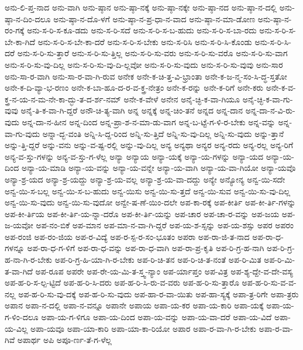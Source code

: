 {ಅನು-ಲಿ-ಪ್ತ-ನಾದ
ಅನು-ವಾಗಿ
ಅನು-ಷ್ಠಾನ
ಅನು-ಷ್ಠಾ-ನಕ್ಕೆ
ಅನು-ಷ್ಠಾ-ನಕ್ಕೇ
ಅನು-ಷ್ಠಾ-ನದ
ಅನು-ಷ್ಠಾ-ನ-ದಲ್ಲಿ
ಅನು-ಷ್ಠಾ-ನ-ದಿಂ-ದಲೂ
ಅನು-ಷ್ಠಾ-ನ-ದೊ-ಳಗೆ
ಅನು-ಷ್ಠಾ-ನ-ಪ್ರ-ಧಾ-ನ-ವಾದ
ಅನು-ಷ್ಠಾ-ನ-ಮಾ-ಡೋಣ
ಅನು-ಷ್ಠಾ-ನ-ರಂ-ಗಕ್ಕೆ
ಅನು-ಸ-ರಿ-ಸ-ಕೂ-ಡದು
ಅನು-ಸ-ರಿ-ಸದೆ
ಅನು-ಸ-ರಿ-ಸ-ಬ-ಹುದು
ಅನು-ಸ-ರಿ-ಸ-ಬಾ-ರದು
ಅನು-ಸ-ರಿ-ಸ-ಬೇ-ಕಾ-ಗಿದೆ
ಅನು-ಸ-ರಿ-ಸ-ಬೇ-ಕಾ-ದರೆ
ಅನು-ಸ-ರಿ-ಸ-ಬೇಕು
ಅನು-ಸ-ರಿಸಿ
ಅನು-ಸ-ರಿ-ಸಿ-ಕೊಂಡು
ಅನು-ಸ-ರಿ-ಸಿ-ದರೆ
ಅನು-ಸ-ರಿ-ಸು-ತ್ತಾರೆ
ಅನು-ಸ-ರಿ-ಸು-ತ್ತಿಲ್ಲ
ಅನು-ಸ-ರಿ-ಸು-ವರು
ಅನು-ಸ-ರಿ-ಸು-ವರೊ
ಅನು-ಸ-ರಿ-ಸು-ವಾಗ
ಅನು-ಸ-ರಿ-ಸು-ವು-ದಿಲ್ಲ
ಅನು-ಸ-ರಿ-ಸು-ವು-ದಿ-ಲ್ಲವೋ
ಅನು-ಸ-ರಿ-ಸು-ವುದು
ಅನು-ಸ-ರಿ-ಸು-ವುವು
ಅನು-ಸಾರ
ಅನು-ಸಾ-ರ-ವಾಗಿ
ಅನು-ಸಾ-ರ-ವಾ-ಗಿ-ರುವ
ಅನೇಕ
ಅನೇ-ಕ-ಚಿ-ತ್ತ-ವಿ-ಭ್ರಾಂತಾ
ಅನೇ-ಕ-ಜ-ನ್ಮ-ಸಂ-ಸಿ-ದ್ಧ-ಸ್ತತೋ
ಅನೇ-ಕ-ದಿ-ವ್ಯಾ-ಭ-ರಣಂ
ಅನೇ-ಕ-ಬಾ-ಹೂ-ದ-ರ-ವ-ಕ್ತ್ರ-ನೇತ್ರಂ
ಅನೇ-ಕ-ರನ್ನು
ಅನೇ-ಕ-ರಿಗೆ
ಅನೇ-ಕರು
ಅನೇ-ಕ-ವ-ಕ್ತ್ರ-ನ-ಯ-ನ-ಮ-ನೇ-ಕಾ-ದ್ಭು-ತ-ದ-ರ್ಶ-ನಮ್
ಅನೇ-ಕ-ವೇಳೆ
ಅನೇನ
ಅನೈ-ಚ್ಛಿ-ಕ-ವಾ-ಗಿಯೂ
ಅನೈ-ಚ್ಛಿ-ಕ-ವಾ-ಗು-ವುವು
ಅನೈ-ತಿ-ಕ-ವಾ-ಗಿ-ದ್ದರೆ
ಅನೌ-ಚಿ-ತ್ಯ-ವಾಗಿ
ಅನ್ನ
ಅನ್ನಕ್ಕೆ
ಅನ್ನ-ಚಿಂ-ತನೆ
ಅನ್ನದ
ಅನ್ನ-ದಾನ
ಅನ್ನ-ದಾ-ನ-ವಿ-ರು-ವುದು
ಅನ್ನ-ದಾ-ನ-ಹೀನ
ಅನ್ನ-ದಿಂದ
ಅನ್ನ-ಪ್ರಾ-ಶ-ನ-ಮಾ-ಡು-ವಾಗ
ಅನ್ನ-ಬ-ಟ್ಟೆ-ಗ-ಳಿ-ರ-ಬೇಕು
ಅನ್ನ-ವನ್ನು
ಅನ್ನ-ವಾ-ಗು-ವುದು
ಅನ್ನಾ-ದ್ಭ-ವಂತಿ
ಅನ್ನಿ-ಸಿ-ದ್ದ-ರಿಂದ
ಅನ್ನಿ-ಸು-ತ್ತಿದೆ
ಅನ್ನಿ-ಸು-ವು-ದಿಲ್ಲ
ಅನ್ನಿ-ಸು-ವುದು
ಅನ್ನು-ತ್ತಾನೆ
ಅನ್ನು-ತ್ತಿ-ದ್ದರೆ
ಅನ್ನು-ವನು
ಅನ್ನು-ವ-ಷ್ಟ-ರಲ್ಲಿ
ಅನ್ನು-ವು-ದಿಲ್ಲ
ಅನ್ಯ
ಅನ್ಯಥಾ
ಅನ್ಯರ
ಅನ್ಯ-ರದು
ಅನ್ಯ-ರಲ್ಲ
ಅನ್ಯ-ರಿಗೆ
ಅನ್ಯ-ವ-ಸ್ತು-ಗಳನ್ನು
ಅನ್ಯ-ವ-ಸ್ತು-ಗ-ಳೆಲ್ಲ
ಅನ್ಯಾ
ಅನ್ಯಾಯ
ಅನ್ಯಾ-ಯಕ್ಕೆ
ಅನ್ಯಾ-ಯ-ಗಳನ್ನು
ಅನ್ಯಾ-ಯದ
ಅನ್ಯಾ-ಯ-ದಿಂದ
ಅನ್ಯಾ-ಯ-ಮಾಡಿ
ಅನ್ಯಾ-ಯ-ವನ್ನು
ಅನ್ಯಾ-ಯ-ವನ್ನೇ
ಅನ್ಯಾ-ಯ-ವಾಗಿ
ಅನ್ಯಾ-ಯ-ವಾ-ಗಿಯೋ
ಅನ್ಯಾ-ಯವೊ
ಅನ್ಯಾ-ಶ್ರ-ಯದ
ಅನ್ಯಾ-ಶ್ರ-ಯದ್ದು
ಅನ್ಯಾ-ಶ್ರ-ಯ-ವಲ್ಲ
ಅನ್ಯಾ-ಶ್ರ-ಯ-ವಾ-ದದ್ದು
ಅನ್ಯೇ
ಅನ್ಯೋನ್ಯ
ಅನ್ವ-ಯಿ-ಸದೇ
ಅನ್ವ-ಯಿ-ಸ-ಬಲ್ಲ
ಅನ್ವ-ಯಿ-ಸ-ಬ-ಹುದು
ಅನ್ವ-ಯಿಸು
ಅನ್ವ-ಯಿ-ಸು-ತ್ತದೆ
ಅನ್ವ-ಯಿ-ಸುವ
ಅನ್ವ-ಯಿ-ಸು-ವು-ದಿಲ್ಲ
ಅನ್ವ-ಯಿ-ಸು-ವುದು
ಅನ್ವ-ಯಿ-ಸು-ವುದೋ
ಅನ್ವೇ-ಷ-ಣೆ-ಯಿಂ-ದಲೇ
ಅಪ-ಕಾ-ರಕ್ಕೆ
ಅಪ-ಕೀರ್ತಿ
ಅಪ-ಕೀ-ರ್ತಿ-ಗಳನ್ನು
ಅಪ-ಕೀ-ರ್ತಿಯ
ಅಪ-ಕೀ-ರ್ತಿ-ಯ-ನ್ನಾ-ದರೊ
ಅಪ-ಕೀ-ರ್ತಿ-ಯನ್ನು
ಅಪ-ಚಾರ
ಅಪ-ಚಾ-ರ-ವನ್ನು
ಅಪ-ಜಯ
ಅಪ-ಜ-ಯವೋ
ಅಪ-ನಂ-ಬಿಕೆ
ಅಪ-ಮಾನ
ಅಪ-ಮಾ-ನ-ವಾ-ಗಿ-ದ್ದರೆ
ಅಪ-ಯ-ಶ-ಸ್ಸನ್ನು
ಅಪ-ಯ-ಶಸ್ಸು
ಅಪರ
ಅಪರಂ
ಅಪ-ರಂಜಿ
ಅಪ-ರಂ-ಜಿಯ
ಅಪ-ರ-ವಿದ್ಯೆ
ಅಪ-ರ-ಸ್ಪ-ರ-ಸಂ-ಭೂತಂ
ಅಪರಾ
ಅಪ-ರಾ-ಜಿ-ತ-ನಾದ
ಅಪ-ರಾ-ಧ-ಗಳನ್ನೂ
ಅಪ-ರಾ-ಧ-ಗ-ಳಿಗೆ
ಅಪ-ರಾ-ಧ-ವನ್ನು
ಅಪ-ರಾ-ಧ-ವಾಗಿ
ಅಪ-ರಾ-ಪ್ರ-ಕೃತಿ
ಅಪ-ರಿ-ಗ್ರ-ಹ-ನಾಗಿ
ಅಪ-ರಿ-ಗ್ರ-ಹ-ನಾ-ಗಿ-ರ-ಬೇಕು
ಅಪ-ರಿ-ಗ್ರ-ಹಿ-ಯಾ-ಗಿ-ರ-ಬೇಕು
ಅಪ-ರಿ-ಚಿ-ತನ
ಅಪ-ರಿ-ಚಿ-ತ-ನಂತೆ
ಅಪ-ರಿ-ಮಿತ
ಅಪ-ರಿ-ಮಿ-ತ-ವಾ-ಗಿದೆ
ಅಪ-ರೂಪ
ಅಪರೇ
ಅಪ-ರೇ-ಯ-ಮಿ-ತ-ಸ್ತ್ವ-ನ್ಯಾಂ
ಅಪ-ರ್ಯಾಪ್ತಂ
ಅಪ-ವಿತ್ರ
ಅಪ-ಶ್ಯ-ದ್ದೇ-ವ-ದೇ-ವಸ್ಯ
ಅಪ-ಹ-ರಿ-ಸ-ಲ್ಪ-ಟ್ಟಿದೆ
ಅಪ-ಹ-ರಿ-ಸಿ-ದರು
ಅಪ-ಹ-ರಿ-ಸಿ-ರು-ವ-ವರು
ಅಪ-ಹ-ರಿ-ಸು-ತ್ತಾರೊ
ಅಪ-ಹ-ರಿ-ಸು-ವ-ವ-ನಲ್ಲ
ಅಪ-ಹ-ರಿ-ಸು-ವು-ದಕ್ಕೆ
ಅಪ-ಹ-ರಿ-ಸು-ವುದು
ಅಪ-ಹಾ-ರ-ವಾ-ಯಿತು
ಅಪ-ಹಾ-ಸ್ಯಕ್ಕೆ
ಅಪಾ-ತ್ರ-ರಿಗೇ
ಅಪಾ-ತ್ರರು
ಅಪಾನ
ಅಪಾ-ನ-ದಲ್ಲಿ
ಅಪಾ-ನ-ವನ್ನೂ
ಅಪಾನೇ
ಅಪಾಯ
ಅಪಾ-ಯ-ಕರ
ಅಪಾ-ಯ-ಕಾರಿ
ಅಪಾ-ಯಕ್ಕೆ
ಅಪಾ-ಯ-ಗ-ಳಿಂ-ದಲೂ
ಅಪಾ-ಯ-ಗ-ಳಿಗೂ
ಅಪಾ-ಯ-ದಿಂದ
ಅಪಾ-ಯ-ವನ್ನು
ಅಪಾ-ಯ-ವಾ-ದರೆ
ಅಪಾ-ಯ-ವಿದೆ
ಅಪಾ-ಯ-ವಿಲ್ಲ
ಅಪಾ-ಯವೂ
ಅಪಾ-ಯಾ-ಕಾರಿ
ಅಪಾ-ಯಾ-ಕಾ-ರಿಯೋ
ಅಪಾರ
ಅಪಾ-ರ-ವಾ-ಗಿ-ರ-ಬೇಕು
ಅಪಾ-ರ-ವಾ-ಗಿವೆ
ಅಪಾರ್ಥ
ಅಪಿ
ಅಪೂ-ರ್ಣ-ತೆ-ಗ-ಳೆಲ್ಲ
}

